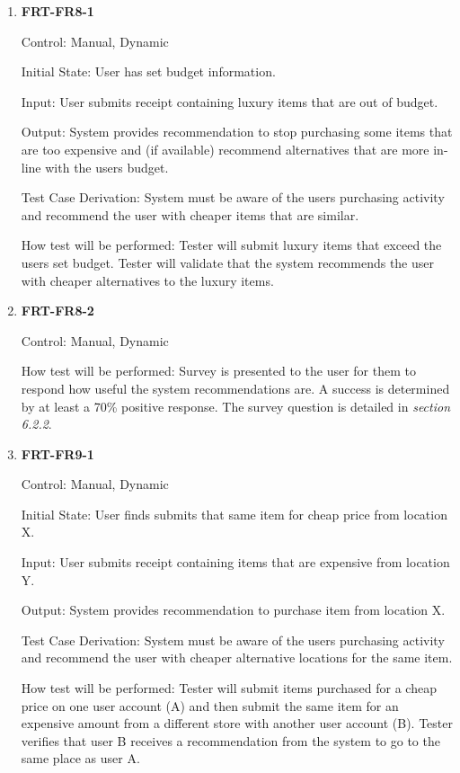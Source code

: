 \documentclass[12pt, titlepage]{article}
\begin{document}
\begin{enumerate}

\item{\textbf{FRT-FR8-1}}

Control: Manual, Dynamic
          
Initial State: User has set budget information.

Input: User submits receipt containing luxury items that are out of budget.
          
Output: System provides recommendation to stop purchasing some items that are too expensive and (if available) recommend alternatives that are more in-line with the users budget.

Test Case Derivation: System must be aware of the users purchasing activity and recommend the user with cheaper items that are similar.
          
How test will be performed: Tester will submit luxury items that exceed the users set budget. Tester will validate that the system recommends the user with cheaper alternatives to the luxury items.

\item{\textbf{FRT-FR8-2}}

Control: Manual, Dynamic

How test will be performed: Survey is presented to the user for them to respond how useful the system recommendations are. A success is determined by at least a 70\% positive response. The survey question is detailed in \textit{section 6.2.2}.

\item{\textbf{FRT-FR9-1}}

Control: Manual, Dynamic
          
Initial State: User finds submits that same item for cheap price from location X.

Input: User submits receipt containing items that are expensive from location Y.
          
Output: System provides recommendation to purchase item from location X.

Test Case Derivation: System must be aware of the users purchasing activity and recommend the user with cheaper alternative locations for the same item.
          
How test will be performed: Tester will submit items purchased for a cheap price on one user account (A) and then submit the same item for an expensive amount from a different store with another user account (B). Tester verifies that user B receives a recommendation from the system to go to the same place as user A.


\end{enumerate}
\end{document}
